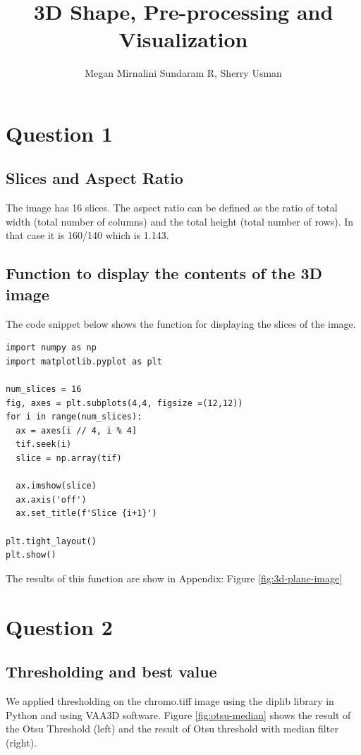 \documentclass{article}
\title{3D Shape, Pre-processing and Visualization}
\author{Megan Mirnalini Sundaram R, Sherry Usman}
\begin{document}
\maketitle



\section*{Question 1}
\subsection*{Slices and Aspect Ratio}
The image has 16 slices. The aspect ratio can be defined as the ratio of total width (total number of columns) and the total height (total number of rows). In that case it is 160/140 which is 1.143. 

\subsection*{Function to display the contents of the 3D image} \label{sec:contents-3D_image}
The code snippet below shows the function for displaying the slices of the image.  
\begin{lstlisting}
import numpy as np
import matplotlib.pyplot as plt 

num_slices = 16
fig, axes = plt.subplots(4,4, figsize =(12,12))
for i in range(num_slices):
  ax = axes[i // 4, i % 4]
  tif.seek(i)
  slice = np.array(tif)

  ax.imshow(slice)
  ax.axis('off')
  ax.set_title(f'Slice {i+1}')

plt.tight_layout()
plt.show()
\end{lstlisting}

The results of this function are show in Appendix: Figure \ref{fig:3d-plane-image}
\section*{Question 2}
\subsection*{Thresholding and best value}
We applied thresholding on the chromo.tiff image using the diplib library in Python and using VAA3D software. Figure \ref{fig:otsu-median} shows the result of the Otsu Threshold (left) and the result of Otsu threshold with median filter (right). 
\end{document}
